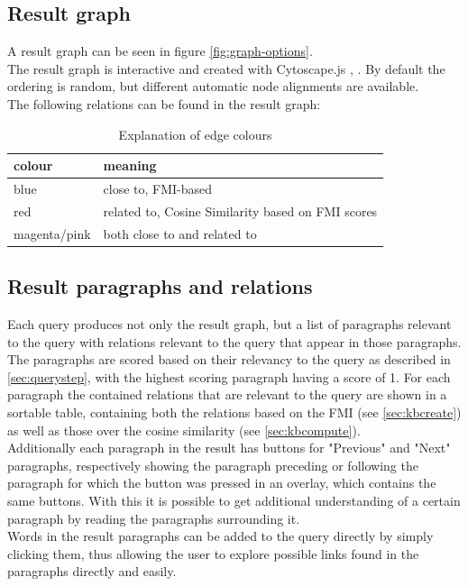 \subsection{Result graph}
\label{sec:resultgraph}
A result graph can be seen in figure \ref{fig:graph-options}.\\
The result graph is interactive and created with Cytoscape.js \cite{doi:10.1093/bioinformatics/btv557}, \cite{Cytoscapejs}. By default the ordering is random, but different automatic node alignments are available.\\
The following relations can be found in the result graph:
\begin{table}[H]
\centering
    \begin{tabular}{|l|l|}
    \hline
    colour & meaning\\
    \hline
    blue & close to, FMI-based \\
    red &related to, Cosine Similarity based on FMI scores \\
    magenta/pink & both close to and related to\\
    \hline
\end{tabular}
\caption{Explanation of edge colours}
\label{tab:relation_meaning}
\end{table}

\subsection{Result paragraphs and relations}
Each query produces not only the result graph, but a list of paragraphs relevant to the query with relations relevant to the query that appear in those paragraphs.\\
The paragraphs are scored based on their relevancy to the query as described in \ref{sec:querystep}, with the highest scoring paragraph having a score of 1. For each paragraph the contained relations that are relevant to the query are shown in a sortable table, containing both the relations based on the FMI (see \ref{sec:kbcreate}) as well as those over the cosine similarity (see \ref{sec:kbcompute}).\\
Additionally each paragraph in the result has buttons for "Previous" and "Next" paragraphs, respectively showing the paragraph preceding or following the paragraph for which the button was pressed in an overlay, which contains the same buttons. With this it is possible to get additional understanding of a certain paragraph by reading the paragraphs surrounding it.\\
Words in the result paragraphs can be added to the query directly by simply clicking them, thus allowing the user to explore possible links found in the paragraphs directly and easily.



